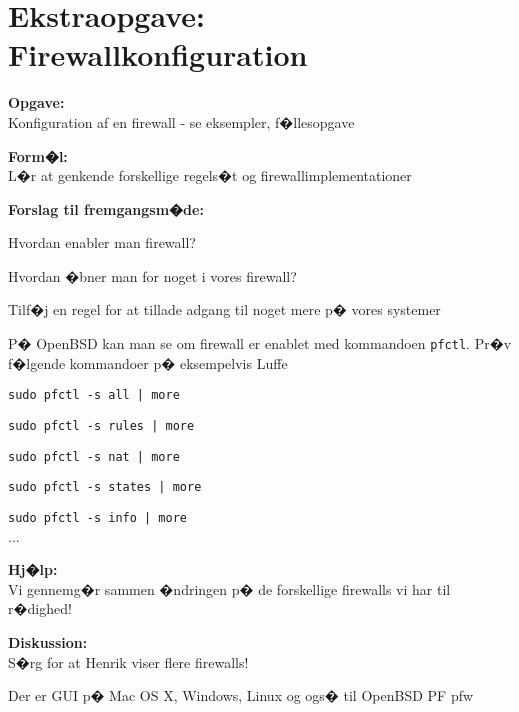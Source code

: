 \documentclass[a4paper,11pt,notitlepage]{oevelser}
\begin{document}
\chapter{Ekstraopgave: Firewallkonfiguration}
\label{ex:unix-basic-firewall}

{\bfseries Opgave:}\\
Konfiguration af en firewall - se eksempler, f�llesopgave

{\bfseries Form�l:}\\
L�r at genkende forskellige regels�t og firewallimplementationer

{\bfseries Forslag til fremgangsm�de:}\\
\begin{list2}
\item Hvordan enabler man firewall?
\item Hvordan �bner man for noget i vores firewall?
\item Tilf�j en regel for at tillade adgang til noget mere p� vores
  systemer
\end{list2}

P� OpenBSD kan man se om firewall er enablet med kommandoen \verb+pfctl+. Pr�v f�lgende kommandoer p� eksempelvis Luffe
\begin{list2}
\item \verb+sudo pfctl -s all | more+
\item \verb+sudo pfctl -s rules | more+
\item \verb+sudo pfctl -s nat | more+
\item \verb+sudo pfctl -s states | more+
\item \verb+sudo pfctl -s info | more+\\
...
\end{list2}

{\bfseries Hj�lp:}\\
Vi gennemg�r sammen �ndringen p� de forskellige firewalls vi har til
r�dighed!



{\bfseries Diskussion:}\\
S�rg for at Henrik viser flere firewalls!

Der er GUI p� Mac OS X, Windows, Linux og ogs� til OpenBSD PF pfw
\end{document}
